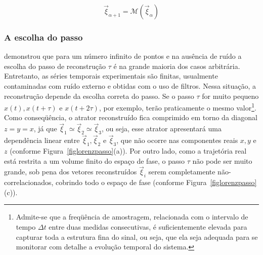 \begin{equation}
\vec{\xi}_{\alpha+1}=\mathcal M(\vec{\xi}_{\alpha})
\label{eqtakensreconst2}
\end{equation} 

\subsubsection{A escolha do passo}

 demonstrou que para um número infinito de pontos e na ausência de ruído a escolha do passo de reconstrução $\tau$ é na grande maioria dos casos arbitrária. Entretanto, as séries temporais experimentais são finitas, usualmente contaminadas com ruído externo e obtidas com o uso de filtros. Nessa situação, a reconstrução depende da escolha correta do passo. Se o passo $\tau$ for muito pequeno $x(t),x(t+\tau)$ e $x(t+2\tau)$, por exemplo, terão praticamente o mesmo valor\footnote{Admite-se que a freqüência de amostragem, relacionada com o intervalo de tempo $\Delta t$ entre duas medidas consecutivas, é suficientemente elevada para capturar toda a estrutura fina do sinal, ou seja, que ela seja adequada para se monitorar com detalhe a evolução temporal do sistema.}. Como conseqüência, o atrator reconstruído fica comprimido em torno da diagonal $z=y=x$, já que $\vec{\xi}_1\simeq\vec{\xi}_2\simeq\vec{\xi}_3$, ou seja, esse atrator apresentará uma dependência linear entre $\vec{\xi}_1,\vec{\xi}_2$ e $\vec{\xi}_3$, que não ocorre nas componentes reais $x,y$ e $z$ (conforme Figura~\ref{figlorenzpasso}(a)). Por outro lado, como a trajetória real está restrita a um volume finito do espaço de fase, o passo $\tau$ não pode ser muito grande, sob pena dos vetores reconstruídos $\vec{\xi}_i$ serem completamente não-correlacionados, cobrindo todo o espaço de fase (conforme Figura~\ref{figlorenzpasso}(c)).

